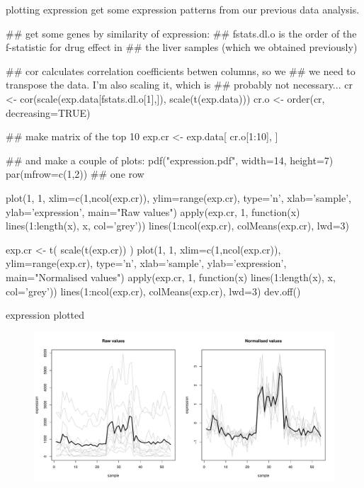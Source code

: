 \documentclass[pdf]{beamer}
\begin{document}
\begin{frame}[fragile]{plotting expression}
  get some expression patterns from our previous data analysis.
  \begin{rcode}
    ## get some genes by similarity of expression:
    ## fstats.dl.o is the order of the f-statistic for drug effect in
    ## the liver samples (which we obtained previously)

    ## cor calculates correlation coefficients betwen columns, so we
    ## we need to transpose the data. I'm also scaling it, which is
    ## probably not necessary...
    cr <- cor(scale(exp.data[fstats.dl.o[1],]), scale(t(exp.data)))
    cr.o <- order(cr, decreasing=TRUE)

    ## make matrix of the top 10
    exp.cr <- exp.data[ cr.o[1:10], ]
    
    ## and make a couple of plots:
    pdf("expression.pdf", width=14, height=7)
    par(mfrow=c(1,2))   ## one row

    plot(1, 1, xlim=c(1,ncol(exp.cr)), ylim=range(exp.cr), type='n', xlab='sample', 
         ylab='expression', main="Raw values")
    apply(exp.cr, 1, function(x){ lines(1:length(x), x, col='grey')})
    lines(1:ncol(exp.cr), colMeans(exp.cr), lwd=3)
    
    exp.cr <- t( scale(t(exp.cr)) )
    plot(1, 1, xlim=c(1,ncol(exp.cr)), ylim=range(exp.cr), type='n', xlab='sample', 
         ylab='expression', main="Normalised values")
    apply(exp.cr, 1, function(x){ lines(1:length(x), x, col='grey')})
    lines(1:ncol(exp.cr), colMeans(exp.cr), lwd=3)
    dev.off()
  \end{rcode}
\end{frame}

\begin{frame}{expression plotted}
  \begin{figure}[ht]
    \includegraphics[width=\textwidth]{images/expression}
  \end{figure}
\end{frame}
\end{document}
